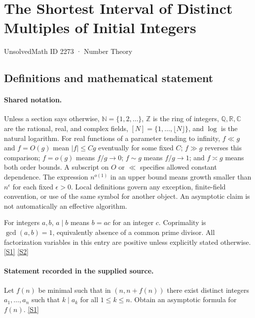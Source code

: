 \documentclass[11pt,a4paper]{article}
\newcommand{\N}{\mathbb{N}}
\newcommand{\Z}{\mathbb{Z}}
\newcommand{\Q}{\mathbb{Q}}
\newcommand{\R}{\mathbb{R}}
\newcommand{\C}{\mathbb{C}}
\newcommand{\sref}[2]{\hyperlink{source:#1:#2}{[S#2]}}
\begin{document}

\setcounter{section}{2272}

\section{The Shortest Interval of Distinct Multiples of Initial Integers}\label{2273}

{\small\sffamily UnsolvedMath ID 2273 · Number Theory}

\subsection{Definitions and mathematical statement}

\paragraph{Shared notation.}Unless a section says otherwise, $\N=\{1,2,\ldots\}$,
$\Z$ is the ring of integers, $\Q,\R,\C$ are the rational, real, and complex
fields, $[N]=\{1,\ldots,\lfloor N\rfloor\}$, and $\log$ is the natural
logarithm. For real functions of a parameter tending to infinity,
$f\ll g$ and $f=O(g)$ mean $|f|\leq Cg$ eventually for some fixed $C$;
$f\gg g$ reverses this comparison; $f=o(g)$ means $f/g\to0$;
$f\sim g$ means $f/g\to1$; and $f\asymp g$ means both order bounds.
A subscript on $O$ or $\ll$ specifies allowed constant dependence.
The expression $n^{o(1)}$ in an upper bound means growth smaller than
$n^\epsilon$ for each fixed $\epsilon>0$. Local definitions govern any
exception, finite-field convention, or use of the same symbol for another
object. An asymptotic claim is not automatically an effective algorithm.



For integers $a,b$, $a\mid b$ means $b=ac$ for an integer $c$. Coprimality is $\gcd(a,b)=1$, equivalently absence of a common prime divisor. All factorization variables in this entry are positive unless explicitly stated otherwise. \sref{2273}{1} \sref{2273}{2}

\paragraph{Statement recorded in the supplied source.}
Let $f(n)$ be minimal such that in $(n,n+f(n))$ there exist distinct integers $a_1,\ldots,a_n$ such that $k\mid a_k$ for all $1\leq k\leq n$. Obtain an asymptotic formula for $f(n)$. \sref{2273}{1}
\end{document}
